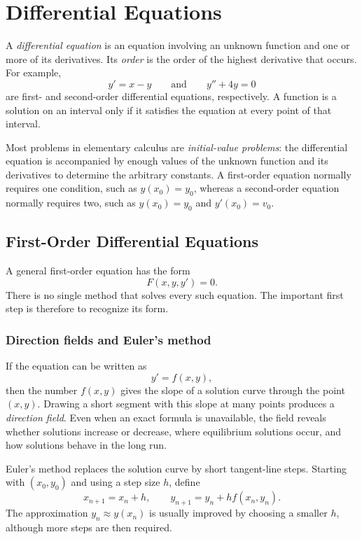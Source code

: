 \section{Differential Equations}

A \emph{differential equation} is an equation involving an unknown function
and one or more of its derivatives.  Its \emph{order} is the order of the
highest derivative that occurs.  For example,
\[
    y'=x-y
    \qquad\text{and}\qquad
    y''+4y=0
\]
are first- and second-order differential equations, respectively.  A
function is a solution on an interval only if it satisfies the equation at
every point of that interval.

Most problems in elementary calculus are \emph{initial-value problems}:
the differential equation is accompanied by enough values of the unknown
function and its derivatives to determine the arbitrary constants.  A
first-order equation normally requires one condition, such as
\(y(x_0)=y_0\), whereas a second-order equation normally requires two, such
as \(y(x_0)=y_0\) and \(y'(x_0)=v_0\).

\subsection{First-Order Differential Equations}

A general first-order equation has the form
\[
    F(x,y,y')=0.
\]
There is no single method that solves every such equation.  The important
first step is therefore to recognize its form.

\subsubsection{Direction fields and Euler's method}

If the equation can be written as
\[
    y'=f(x,y),
\]
then the number \(f(x,y)\) gives the slope of a solution curve through the
point \((x,y)\).  Drawing a short segment with this slope at many points
produces a \emph{direction field}.  Even when an exact formula is
unavailable, the field reveals whether solutions increase or decrease,
where equilibrium solutions occur, and how solutions behave in the long
run.

Euler's method replaces the solution curve by short tangent-line steps.
Starting with \((x_0,y_0)\) and using a step size \(h\), define
\[
    x_{n+1}=x_n+h,
    \qquad
    y_{n+1}=y_n+h f(x_n,y_n).
\]
The approximation \(y_n\approx y(x_n)\) is usually improved by choosing a
smaller \(h\), although more steps are then required.

